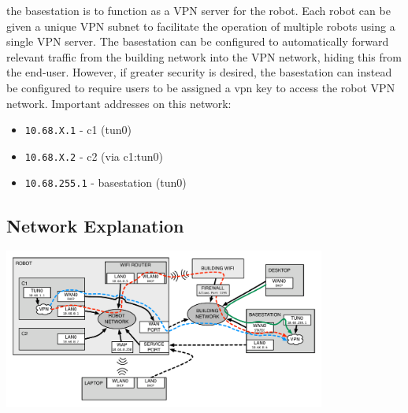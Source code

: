 \begin{itemize}
  the basestation is to function as a VPN server for the robot.  Each
  robot can be given a unique VPN subnet to facilitate the operation
  of multiple robots using a single VPN server.  The basestation can
  be configured to automatically forward relevant traffic from the
  building network into the VPN network, hiding this from the
  end-user.  However, if greater security is desired, the basestation
  can instead be configured to require users to be assigned a vpn key
  to access the robot VPN network.  Important addresses on this
  network:
  \begin{itemize}
  \item \texttt{10.68.X.1} - c1 (tun0)
  \item \texttt{10.68.X.2} - c2 (via c1:tun0)
  \item \texttt{10.68.255.1} - basestation (tun0)
  \end{itemize}
\end{itemize}
\subsection{Network Explanation}
\includegraphics[width=400px]{images/pr2_network_diagram.pdf}

